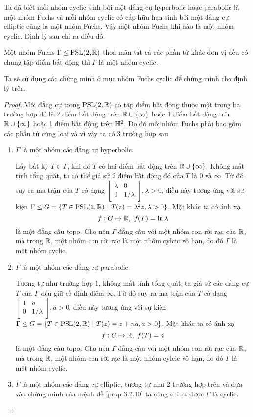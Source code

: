 Ta đã biết mỗi nhóm cyclic sinh bởi một đẳng cự hyperbolic hoặc parabolic là một nhóm Fuchs và mỗi nhóm cyclic có cấp hữu hạn sinh bởi một đẳng cự elliptic cũng là một nhóm Fuchs. Vậy một nhóm Fuchs khi nào là một nhóm cyclic. Định lý sau chỉ ra điều đó. 
\begin{thm}\label{thm 3.3.10}
    Một nhóm Fuchs $\Gamma \leq \operatorname{PSL}(2,\mathbb{R})$ thoả mãn tất cả các phần tử khác đơn vị đều có chung tập điểm bất động thì $\Gamma$ là một nhóm cyclic.
\end{thm}
Ta sẽ sử dụng các chứng minh ở mục nhóm Fuchs cyclic để chứng minh cho định lý trên.
\begin{proof}
    Mỗi đẳng cự trong $\operatorname{PSL}(2,\mathbb{R})$ có tập điểm bất động thuộc một trong ba trường hợp đó là $2$ điểm bất động trên $\mathbb{R} \cup \{\infty\}$ hoặc 
    1 điểm bất động trên $\mathbb{R} \cup \{\infty\}$ hoặc 1 điểm bất động trên $\mathbb{H}^2$. Do đó mỗi nhóm Fuchs phải bao gồm các phần tử cùng loại và vì vậy ta có 3 trường hợp sau
    \begin{enumerate}
        \item $\Gamma$ là một nhóm các đẳng cự hyperbolic.

        Lấy bất kỳ $T \in \Gamma$, khi đó $T$ có hai điểm bất động trên $\mathbb{R} \cup \{\infty\}$. Không mất tính tổng quát, ta có thể giả sử 2 điểm bất động đó của $T$ là $0$ và $\infty$. Từ đó suy ra ma trận của $T$ có dạng $\begin{bmatrix}
            \lambda & 0 \\
            0 & 1/\lambda
        \end{bmatrix}, \lambda >0$, điều này tương ứng với sự kiện $\Gamma \leq G = \{T \in \operatorname{PSL}(2,\mathbb{R})~|~T(z) = \lambda^2 z, \lambda>0\}$. Mặt khác ta có ánh xạ
        \[f: G \mapsto \mathbb{R},~f(T) = \ln{\lambda}\]
        là một đẳng cấu topo. Cho nên $\Gamma$ đẳng cấu với một nhóm con rời rạc của $\mathbb{R}$, mà trong $\mathbb{R}$,  một nhóm con rời rạc là một nhóm cylcic vô hạn, do đó $\Gamma$ là một nhóm cyclic.

        \item $\Gamma$ là một nhóm các đẳng cự parabolic.

        Tương tự như trường hợp 1, không mất tính tổng quát, ta giả sử các đẳng cự $T$ của $\Gamma$ đều giữ cố định điêm $\infty$.  Từ đó suy ra ma trận của $T$ có dạng $\begin{bmatrix}
            1 & a \\
            0 & 1/\lambda
        \end{bmatrix}, a >0$, điều này tương ứng với sự kiện $\Gamma \leq G = \{T \in \operatorname{PSL}(2,\mathbb{R})~|~T(z) = z+ na, a>0\}$. Mặt khác ta có ánh xạ
        \[f: G \mapsto \mathbb{R},~f(T) = a\]
        là một đẳng cấu topo. Cho nên $\Gamma$ đẳng cấu với một nhóm con rời rạc của $\mathbb{R}$, mà trong $\mathbb{R}$,  một nhóm con rời rạc là một nhóm cylcic vô hạn, do đó $\Gamma$ là một nhóm cyclic.
        \item $\Gamma$ là một nhóm các đẳng cự elliptic, tương tự như 2 trường hợp trên và dựa vào chứng minh của mệnh đề \ref{prop 3.2.10} ta cũng chỉ ra được $\Gamma$ là cyclic. 
    \end{enumerate}
\end{proof}
